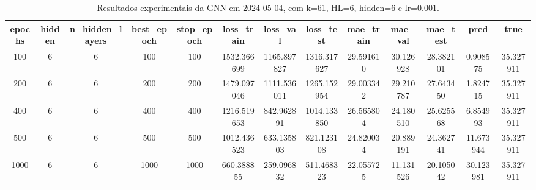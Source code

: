 \begin{table}[h]
\centering
\caption{Resultados experimentais da GNN em 2024-05-04, com k=61, HL=6, hidden=6 e lr=0.001.}
\label{tab:gnn_results_k61_hl6_h6_d20240504}
\begin{tabular}{ccccccccccccc}
\toprule
epochs & hidden & n\_hidden\_layers & best\_epoch & stop\_epoch & loss\_train & loss\_val & loss\_test & mae\_train & mae\_val & mae\_test & pred & true \\
\midrule
100 & 6 & 6 & 100 & 100 & 1532.366699 & 1165.897827 & 1316.317627 & 29.591610 & 30.126928 & 28.382101 & 0.908575 & 35.327911 \\
200 & 6 & 6 & 200 & 200 & 1479.097046 & 1111.536011 & 1265.152954 & 29.003342 & 29.210787 & 27.643450 & 1.824715 & 35.327911 \\
400 & 6 & 6 & 400 & 400 & 1216.519653 & 842.962891 & 1014.133850 & 26.565804 & 24.180510 & 25.625568 & 6.854993 & 35.327911 \\
500 & 6 & 6 & 500 & 500 & 1012.436523 & 633.135803 & 821.123108 & 24.820034 & 20.889191 & 24.362741 & 11.673944 & 35.327911 \\
1000 & 6 & 6 & 1000 & 1000 & 660.388855 & 259.096832 & 511.468323 & 22.055725 & 11.131526 & 20.105042 & 30.123981 & 35.327911 \\
\bottomrule
\end{tabular}
\end{table}
